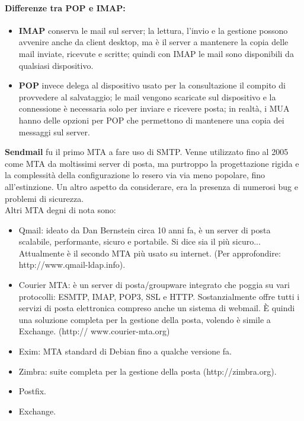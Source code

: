 \documentclass[a4paper]{report}
\begin{document}
\paragraph{Differenze tra POP e IMAP:}
\begin{itemize}
\item \textbf{IMAP} conserva le mail sul server; la lettura, l'invio e la gestione possono avvenire anche da client desktop, ma è il server a mantenere la copia delle mail inviate, ricevute e scritte; quindi con IMAP le mail sono disponibili da qualsiasi dispositivo.
\item \textbf{POP} invece delega al dispositivo usato per la consultazione il compito di provvedere al salvataggio; le mail vengono scaricate sul dispositivo e la connessione è necessaria solo per inviare e ricevere posta; in realtà, i MUA hanno delle opzioni per POP che permettono di mantenere una copia dei messaggi sul server.
\end{itemize}
\textbf{Sendmail } fu il primo MTA a fare uso di SMTP. Venne utilizzato fino al 2005 come MTA da moltissimi server di posta, ma purtroppo la progettazione rigida e la complessità della configurazione lo resero via via meno popolare, fino all'estinzione. Un altro aspetto da considerare, era la presenza di numerosi bug e problemi di sicurezza.\\
Altri MTA degni di nota sono:
\begin{itemize}
\item Qmail: ideato da Dan Bernstein circa 10 anni fa, è un server di posta
scalabile, performante, sicuro e portabile. Si dice sia il più sicuro...
Attualmente è il secondo MTA più usato su internet. (Per approfondire:
http://www.qmail-ldap.info).
\item Courier MTA: è un server di posta/groupware integrato che poggia su vari
protocolli: ESMTP, IMAP, POP3, SSL e HTTP. Sostanzialmente offre tutti i
servizi di posta elettronica compreso anche un sistema di webmail. È quindi
una soluzione completa per la gestione della posta, volendo è simile a
Exchange. (http:// www.courier-mta.org)
\item Exim: MTA standard di Debian fino a qualche versione fa.
\item Zimbra: suite completa per la gestione della posta (http://zimbra.org).
\item Postfix.
\item Exchange.
\end{itemize}
\end{document}
